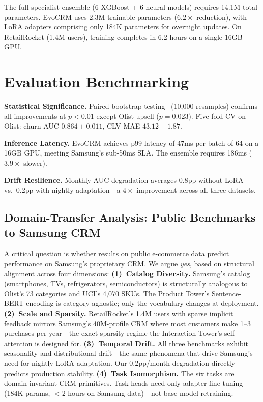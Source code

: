 \documentclass[10pt,twocolumn]{article}
\begin{document}
The full specialist ensemble (6 XGBoost + 6 neural models) requires 14.1M total parameters. EvoCRM uses 2.3M trainable parameters ($6.2\times$ reduction), with LoRA adapters comprising only 184K parameters for overnight updates. On RetailRocket (1.4M users), training completes in 6.2 hours on a single 16GB GPU.

\section{Evaluation Benchmarking}

\textbf{Statistical Significance.} Paired bootstrap testing~\cite{efron1994bootstrap} (10,000 resamples) confirms all improvements at $p < 0.01$ except Olist upsell ($p = 0.023$). Five-fold CV on Olist: churn AUC $0.864 \pm 0.011$, CLV MAE $43.12 \pm 1.87$.

\textbf{Inference Latency.} EvoCRM achieves p99 latency of 47ms per batch of 64 on a 16GB GPU, meeting Samsung's sub-50ms SLA. The ensemble requires 186ms ($3.9\times$ slower).

\textbf{Drift Resilience.} Monthly AUC degradation averages 0.8pp without LoRA vs.\ 0.2pp with nightly adaptation---a $4\times$ improvement across all three datasets.

\subsection{Domain-Transfer Analysis: Public Benchmarks to Samsung CRM}

A critical question is whether results on public e-commerce data predict performance on Samsung's proprietary CRM. We argue \emph{yes}, based on structural alignment across four dimensions:
\textbf{(1)~Catalog Diversity.} Samsung's catalog (smartphones, TVs, refrigerators, semiconductors) is structurally analogous to Olist's 73 categories and UCI's 4,070 SKUs. The Product Tower's Sentence-BERT encoding is category-agnostic; only the vocabulary changes at deployment.
\textbf{(2)~Scale and Sparsity.} RetailRocket's 1.4M users with sparse implicit feedback mirrors Samsung's 40M-profile CRM where most customers make 1--3 purchases per year---the exact sparsity regime the Interaction Tower's self-attention is designed for.
\textbf{(3)~Temporal Drift.} All three benchmarks exhibit seasonality and distributional drift---the same phenomena that drive Samsung's need for nightly LoRA adaptation. Our 0.2pp/month degradation directly predicts production stability.
\textbf{(4)~Task Isomorphism.} The six tasks are domain-invariant CRM primitives. Task heads need only adapter fine-tuning (184K params, $<$2 hours on Samsung data)---not base model retraining.
\end{document}
